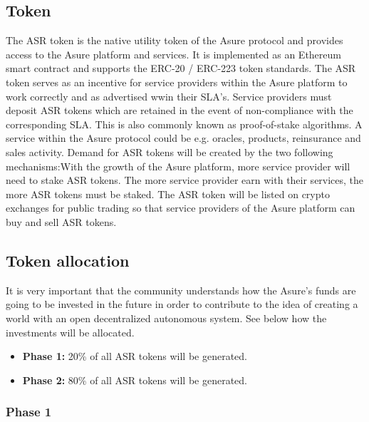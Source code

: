 \subsection{Token}

The ASR token is the native utility token of the Asure protocol and provides access to the Asure platform and services. It is implemented as an Ethereum smart contract and supports the  ERC-20 / ERC-223 token standards. 
\newline
The ASR token serves as an incentive for service providers within the Asure platform to work correctly and as advertised wwin their SLA’s. Service providers must deposit ASR tokens which are retained in the event of non-compliance with the corresponding SLA. This is also commonly known as proof-of-stake algorithms. A service within the Asure protocol could be e.g. oracles, products, reinsurance and sales activity.\newline
Demand for ASR tokens will be created by the two following mechanisms:With the growth of the Asure platform, more service provider will need to stake ASR tokens. The more service provider earn with their services, the more ASR tokens must be staked.
The ASR token will be listed on crypto exchanges for public trading so that service providers of the Asure platform can buy and sell ASR tokens.
\newline\newline



\subsection{Token allocation}

It is very important that the community understands how the Asure’s funds are going to be invested in the future in order to contribute to the idea of creating a world with an open decentralized autonomous system. See below how the investments will be allocated. 

\begin{itemize}
\item \textbf{Phase 1:} 20\% of all ASR tokens will be generated.
\item \textbf{Phase 2:} 80\% of all ASR tokens will be generated.
\end{itemize}

\subsubsection{Phase 1}


